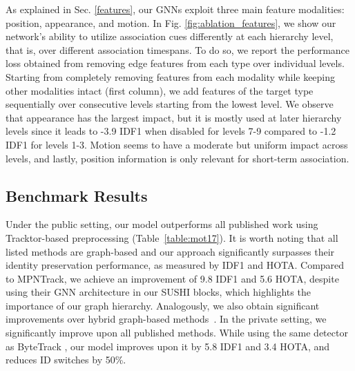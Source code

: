 \documentclass[10pt,twocolumn,letterpaper]{article}
\begin{document}
{{ As explained in Sec. \ref{features}, our GNNs exploit three main feature modalities: position, appearance, and motion. In Fig. \ref{fig:ablation_features}, we show our network's ability to utilize association cues differently at each hierarchy level, that is, over different association timespans. 
To do so, we report the performance loss obtained from removing edge features from each type over individual levels. 
Starting from completely removing features from each modality while keeping other modalities intact (first column), we add features of the target type sequentially over consecutive levels starting from the lowest level. We observe that appearance has the largest impact, but it is mostly used at later hierarchy levels since it leads to -3.9 IDF1 when disabled for levels 7-9 compared to -1.2 IDF1 for levels 1-3. Motion seems to have a moderate but uniform impact across levels, and lastly, position information is only relevant for short-term association. 














\subsection{Benchmark Results}


 Under the public setting, our model outperforms all published work using Tracktor-based preprocessing (Table~\ref{table:mot17}). It is worth noting that all listed methods are graph-based and our approach significantly surpasses their identity preservation performance, as measured by IDF1 and HOTA. Compared to MPNTrack, we achieve an improvement of 9.8 IDF1 and 5.6 HOTA, despite using their GNN architecture in our SUSHI blocks, which highlights the importance of our graph hierarchy. Analogously, we also obtain significant improvements over hybrid graph-based methods~\cite{aplift, lift, lpc}. In the private setting, we significantly improve upon all published methods. While using the same detector as ByteTrack \cite{bytetrack}, our model improves upon it by 5.8 IDF1 and 3.4 HOTA, and reduces ID switches by 50\%. \begin{table}[h]
\center
\tabcolsep=0.11cm

\end{table}}}
\end{document}
